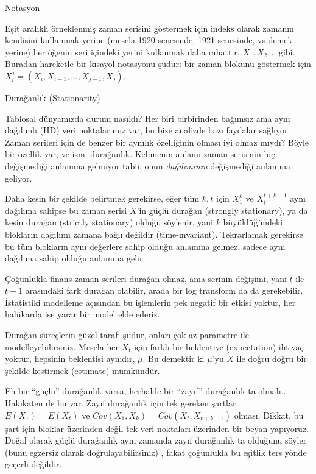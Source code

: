 \documentclass[12pt,fleqn]{article}\usepackage{../../common}
\begin{document}
Notasyon

Eşit aralıklı örneklenmiş zaman serisini göstermek için indeks olarak
zamanın kendisini kullanmak yerine (mesela 1920 senesinde, 1921 senesinde,
vs demek yerine) her öğenin seri içindeki yerini kullanmak daha rahattır,
$X_1,X_2,..$ gibi. Buradan hareketle bir kısayol notasyonu şudur: bir zaman
blokunu göstermek için $X_i^j = (X_i,X_{i+1},...,X_{j-1},X_j)$.

Durağanlık (Stationarity)

Tablosal dünyamızda durum nasıldı? Her biri birbirinden bağımsız ama aynı
dağılımlı (IID) veri noktalarımız var, bu bize analizde bazı faydalar
sağlıyor. Zaman serileri için de benzer bir aynılık özelliğinin olması iyi olmaz
mıydı?  Böyle bir özellik var, ve ismi durağanlık. Kelimenin anlamı zaman
serisinin hiç değişmediği anlamına gelmiyor tabii, onun {\em dağılımının}
değişmediği anlamına geliyor.

Daha kesin bir şekilde belirtmek gerekirse, eğer tüm $k,t$ için $X_1^k$ ve
$X_t^{t+k-1}$ aynı dağılıma sahipse bu zaman serisi $X$'in güçlü durağan
(strongly stationary), ya da kesin durağan (strictly stationary) olduğu
söylenir, yani $k$ büyüklüğündeki blokların dağılımı zamana bağlı değildir
(time-ınvariant). Tekrarlamak gerekirse bu tüm blokların aynı değerlere sahip
olduğu anlamına gelmez, sadece aynı dağılıma sahip olduğu anlamına gelir.

Çoğunlukla finans zaman serileri durağan olmaz, ama serinin değişimi, yani $t$
ile $t-1$ arasındaki fark durağan olabilir, arada bir log transform da da
gerekebilir. İstatistiki modelleme açısından bu işlemlerin pek negatif bir
etkisi yoktur, her halükarda ise yarar bir model elde ederiz.

Durağan süreçlerin güzel tarafı şudur, onları çok az parametre ile
modelleyebilirsiniz. Mesela her $X_t$ için farklı bir beklentiye (expectation)
ihtiyaç yoktur, hepsinin beklentisi aynıdır, $\mu$. Bu demektir ki $\mu$'yu
$\bar{X}$ ile doğru doğru bir şekilde kestirmek (estimate) mümkündür.

Eh bir ``güçlü'' durağanlık varsa, herhalde bir ``zayıf'' durağanlık ta
olmalı.. Hakikaten de bu var. Zayıf durağanlık için tek gereken şartlar $E(X_1)
= E(X_t)$ ve $Cov(X_1,X_k) = Cov(X_t,X_{t+k-1})$ olması. Dikkat, bu şart için
bloklar üzerinden değil tek veri noktaları üzerinden bir beyan yapıyoruz. Doğal
olarak güçlü durağanlık aynı zamanda zayıf durağanlık ta olduğunu söyler (bunu
egzersiz olarak doğrulayabilirsiniz) , fakat çoğunlukla bu eşitlik ters yönde
geçerli değildir.
\end{document}
